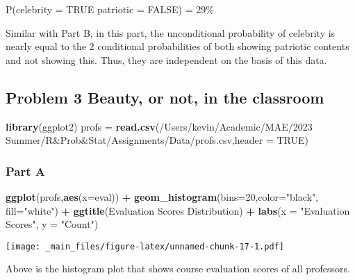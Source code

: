 \documentclass[
]{article}
\newenvironment{Shaded}{\begin{snugshade}}{\end{snugshade}}
\newcommand{\AttributeTok}[1]{\textcolor[rgb]{0.13,0.29,0.53}{#1}}
\newcommand{\ConstantTok}[1]{\textcolor[rgb]{0.56,0.35,0.01}{#1}}
\newcommand{\DecValTok}[1]{\textcolor[rgb]{0.00,0.00,0.81}{#1}}
\newcommand{\FunctionTok}[1]{\textcolor[rgb]{0.13,0.29,0.53}{\textbf{#1}}}
\newcommand{\NormalTok}[1]{#1}
\newcommand{\OtherTok}[1]{\textcolor[rgb]{0.56,0.35,0.01}{#1}}
\newcommand{\SpecialCharTok}[1]{\textcolor[rgb]{0.81,0.36,0.00}{\textbf{#1}}}
\newcommand{\StringTok}[1]{\textcolor[rgb]{0.31,0.60,0.02}{#1}}
\begin{document}
P(celebrity = TRUE \textbar{} patriotic = FALSE) = 29\%

Similar with Part B, in this part, the unconditional probability of celebrity is nearly equal to the 2 conditional probabilities of both showing patriotic contents and not showing this. Thus, they are independent on the basis of this data.

\hypertarget{problem-3-beauty-or-not-in-the-classroom}{%
\subsection{Problem 3 Beauty, or not, in the classroom}\label{problem-3-beauty-or-not-in-the-classroom}}

\begin{Shaded}
\begin{Highlighting}[]
\FunctionTok{library}\NormalTok{(ggplot2)}
\NormalTok{profs }\OtherTok{=} \FunctionTok{read.csv}\NormalTok{(}\StringTok{\textquotesingle{}/Users/kevin/Academic/MAE/2023 Summer/R\&Prob\&Stat/Assignments/Data/profs.csv\textquotesingle{}}\NormalTok{,}\AttributeTok{header =} \ConstantTok{TRUE}\NormalTok{)}
\end{Highlighting}
\end{Shaded}

\hypertarget{part-a-2}{%
\subsubsection{Part A}\label{part-a-2}}

\begin{Shaded}
\begin{Highlighting}[]
\FunctionTok{ggplot}\NormalTok{(profs,}\FunctionTok{aes}\NormalTok{(}\AttributeTok{x=}\NormalTok{eval)) }\SpecialCharTok{+} \FunctionTok{geom\_histogram}\NormalTok{(}\AttributeTok{bins=}\DecValTok{20}\NormalTok{,}\AttributeTok{color=}\StringTok{"black"}\NormalTok{, }\AttributeTok{fill=}\StringTok{"white"}\NormalTok{) }\SpecialCharTok{+} \FunctionTok{ggtitle}\NormalTok{(}\StringTok{\textquotesingle{}Evaluation Scores Distribution\textquotesingle{}}\NormalTok{) }\SpecialCharTok{+} \FunctionTok{labs}\NormalTok{(}\AttributeTok{x =} \StringTok{"Evaluation Scores"}\NormalTok{, }\AttributeTok{y =} \StringTok{"Count"}\NormalTok{)}
\end{Highlighting}
\end{Shaded}

\texttt{[image: \_main\_files/figure-latex/unnamed-chunk-17-1.pdf]}

Above is the histogram plot that shows course evaluation scores of all professors.
\end{document}
